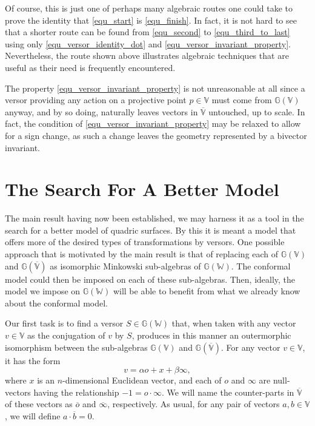 \documentclass{birkjour}
\theoremstyle{definition}
\theoremstyle{remark}
\numberwithin{equation}{section}
\newcommand{\G}{\mathbb{G}}
\newcommand{\V}{\mathbb{V}}
\newcommand{\W}{\mathbb{W}}
\newcommand{\nvao}{o}
\newcommand{\nvai}{\infty}
\begin{document}
Of course, this is just one of perhaps many algebraic routes one could take to prove the
identity that \eqref{equ_start} is \eqref{equ_finish}.  In fact, it is not hard to see that
a shorter route can be found from \eqref{equ_second} to \eqref{equ_third_to_last} using only
\eqref{equ_versor_identity_dot} and \eqref{equ_versor_invariant_property}.  Nevertheless,
the route shown above illustrates algebraic techniques that are useful as their need is frequently encountered.

The property \eqref{equ_versor_invariant_property} is not unreasonable at all
since a versor providing any action on a projective point $p\in\V$ must come from $\G(\V)$ anyway,
and by so doing, naturally leaves vectors in $\overline{\V}$ untouched, up to scale.
In fact, the condition of \eqref{equ_versor_invariant_property} may be relaxed to allow
for a sign change, as such a change leaves the geometry represented by a bivector invariant.

\section{The Search For A Better Model}

The main result having now been established, we may harness it as a tool in the search
for a better model of quadric surfaces.  By this it is meant a model that offers
more of the desired types of transformations by versors.  One possible approach
that is motivated by the main result is that of replacing each of $\G(\V)$ and
$\G(\overline{\V})$ as isomorphic Minkowski sub-algebras of $\G(\W)$.
The conformal model could then be imposed on each of these sub-algebras.
Then, ideally, the model we impose on $\G(\W)$ will be able to benefit from
what we already know about the conformal model.

Our first task is to find a versor $S\in\G(\W)$ that, when taken with any
vector $v\in\V$ as the conjugation of $v$ by $S$, produces in this manner
an outermorphic isomorphism between the sub-algebras $\G(\V)$ and $\G(\overline{\V})$.
For any vector $v\in\V$, it has the form
\begin{equation}
v = \alpha\nvao + x + \beta\nvai,
\end{equation}
where $x$ is an $n$-dimensional Euclidean vector, and each of $\nvao$ and $\nvai$
are null-vectors having the relationship $-1=\nvao\cdot\nvai$.  We will name the
counter-parts in $\overline{\V}$ of these vectors as $\overline{\nvao}$ and $\overline{\nvai}$, respectively.
As usual, for any pair of vectors $a,b\in\V$, we will define $a\cdot\overline{b}=0$.
\end{document}
